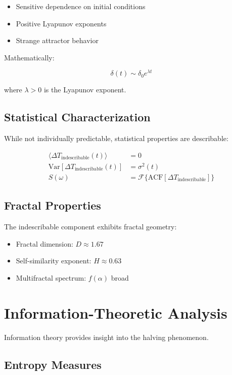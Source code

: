 \documentclass[12pt,a4paper]{report}
\begin{document}
\begin{itemize}
\item Sensitive dependence on initial conditions
\item Positive Lyapunov exponents
\item Strange attractor behavior
\end{itemize}

Mathematically:

\[
\delta(t) \sim \delta_0 e^{\lambda t}
\]

where $\lambda > 0$ is the Lyapunov exponent.

\subsection{Statistical Characterization}

While not individually predictable, statistical properties are describable:

\begin{align*}
\langle \Delta T_{\text{indescribable}}(t) \rangle &= 0 \\
\text{Var}[\Delta T_{\text{indescribable}}(t)] &= \sigma^2(t) \\
S(\omega) &= \mathcal{F}\{\text{ACF}[\Delta T_{\text{indescribable}}]\}
\end{align*}

\subsection{Fractal Properties}

The indescribable component exhibits fractal geometry:

\begin{itemize}
\item Fractal dimension: $D \approx 1.67$
\item Self-similarity exponent: $H \approx 0.63$
\item Multifractal spectrum: $f(\alpha)$ broad
\end{itemize}

\section{Information-Theoretic Analysis}

Information theory provides insight into the halving phenomenon.

\subsection{Entropy Measures}
\end{document}
